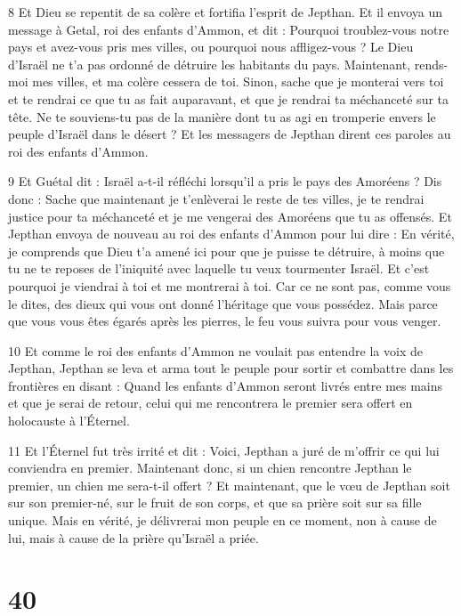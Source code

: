 \par 8 Et Dieu se repentit de sa colère et fortifia l'esprit de Jepthan. Et il envoya un message à Getal, roi des enfants d'Ammon, et dit : Pourquoi troublez-vous notre pays et avez-vous pris mes villes, ou pourquoi nous affligez-vous ? Le Dieu d'Israël ne t'a pas ordonné de détruire les habitants du pays. Maintenant, rends-moi mes villes, et ma colère cessera de toi. Sinon, sache que je monterai vers toi et te rendrai ce que tu as fait auparavant, et que je rendrai ta méchanceté sur ta tête. Ne te souviens-tu pas de la manière dont tu as agi en tromperie envers le peuple d'Israël dans le désert ? Et les messagers de Jepthan dirent ces paroles au roi des enfants d'Ammon.

\par 9 Et Guétal dit : Israël a-t-il réfléchi lorsqu'il a pris le pays des Amoréens ? Dis donc : Sache que maintenant je t'enlèverai le reste de tes villes, je te rendrai justice pour ta méchanceté et je me vengerai des Amoréens que tu as offensés. Et Jepthan envoya de nouveau au roi des enfants d'Ammon pour lui dire : En vérité, je comprends que Dieu t'a amené ici pour que je puisse te détruire, à moins que tu ne te reposes de l'iniquité avec laquelle tu veux tourmenter Israël. Et c'est pourquoi je viendrai à toi et me montrerai à toi. Car ce ne sont pas, comme vous le dites, des dieux qui vous ont donné l'héritage que vous possédez. Mais parce que vous vous êtes égarés après les pierres, le feu vous suivra pour vous venger.

\par 10 Et comme le roi des enfants d'Ammon ne voulait pas entendre la voix de Jepthan, Jepthan se leva et arma tout le peuple pour sortir et combattre dans les frontières en disant : Quand les enfants d'Ammon seront livrés entre mes mains et que je serai de retour, celui qui me rencontrera le premier sera offert en holocauste à l'Éternel.

\par 11 Et l'Éternel fut très irrité et dit : Voici, Jepthan a juré de m'offrir ce qui lui conviendra en premier. Maintenant donc, si un chien rencontre Jepthan le premier, un chien me sera-t-il offert ? Et maintenant, que le vœu de Jepthan soit sur son premier-né, sur le fruit de son corps, et que sa prière soit sur sa fille unique. Mais en vérité, je délivrerai mon peuple en ce moment, non à cause de lui, mais à cause de la prière qu'Israël a priée.

\chapter{40}

